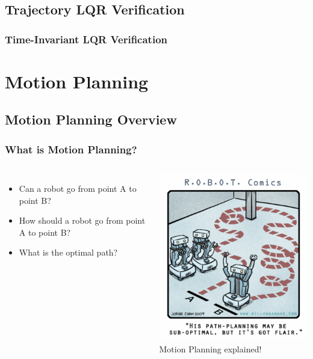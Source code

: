 \documentclass{beamer}
\begin{document}
\subsection{Trajectory LQR Verification}

\begin{frame}
\frametitle{Time-Invariant LQR Verification}

\end{frame}

\section{Motion Planning}
\subsection{Motion Planning Overview}

\begin{frame}
\frametitle{What is Motion Planning?}

\begin{columns}[c] 
\begin{itemize}
\item Can a robot go from point A to point B? \vspace{0.2cm}
\item  How should a robot go from point A to point B?\vspace{0.2cm}
\item What is the optimal path?
\end{itemize}

\centering
 \includegraphics[width=.5\textwidth]{figures/motionplanning.png}\\
Motion Planning explained!  \cite{p2}
\end{columns}

\end{frame}
\end{document}
